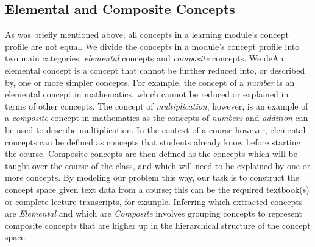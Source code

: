 \subsection{Elemental and Composite Concepts}
As was briefly mentioned above; all concepts in a learning module's concept profile are not equal.
We divide the concepts in a module's concept profile into two main categories: \textit{elemental} concepts and \textit{composite} concepts. 
We deAn elemental concept is a concept that cannot be further reduced into, or described by, one or more simpler concepts. For example, the concept of a \textit{number} is an elemental concept in mathematics, which cannot be reduced or explained in terms of other concepts. The concept of \textit{multiplication}, however, is an example of a \textit{composite} concept in mathematics as the concepts of \textit{numbers} and \textit{addition} can be used to describe multiplication. In the context of a course however, elemental concepts can be defined as concepts that students already know before starting the course. Composite concepts are then defined as the concepts which will be taught over the course of the class, and which will need to be explained by one or more concepts.
By modeling our problem this way, our task is to construct the concept space given text data from a course; this can be the required textbook(s) or complete lecture transcripts, for example. Inferring which extracted concepts are \textit{Elemental} and which are \textit{Composite} involves grouping concepts to represent composite concepts that are higher up in the hierarchical structure of the concept space.
